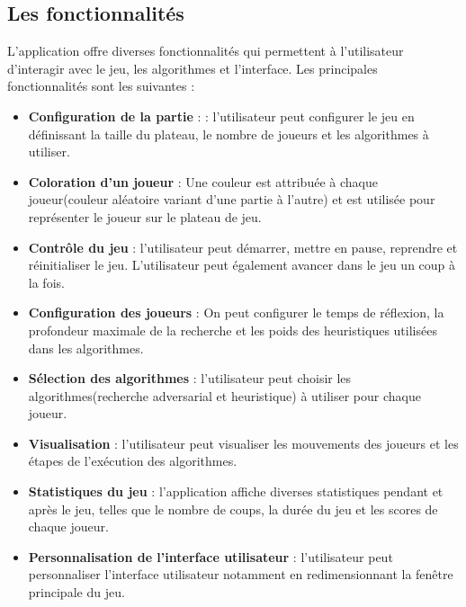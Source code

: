 \subsection{Les fonctionnalités}
L'application offre diverses fonctionnalités qui permettent à l'utilisateur d'interagir avec le jeu, les algorithmes et l'interface. 
Les principales fonctionnalités sont les suivantes :
\begin{itemize}
	\item \textbf{Configuration de la partie} : : l'utilisateur peut configurer le jeu en définissant la taille du plateau, le nombre de joueurs et les algorithmes à utiliser.
	\item \textbf{Coloration d'un joueur} : Une couleur est attribuée à chaque joueur(couleur aléatoire variant d'une partie à l'autre) et est utilisée pour représenter le joueur sur le plateau de jeu.
	\item \textbf{Contrôle du jeu} : l'utilisateur peut démarrer, mettre en pause, reprendre et réinitialiser le jeu. L'utilisateur peut également avancer dans le jeu un coup à la fois.
	\item \textbf{Configuration des joueurs} : On peut configurer le temps de réflexion, la profondeur maximale de la recherche et les poids des heuristiques utilisées dans les algorithmes.
	\item \textbf{Sélection des algorithmes} : l'utilisateur peut choisir les algorithmes(recherche adversarial et heuristique) à utiliser pour chaque joueur.
	\item \textbf{Visualisation} : l'utilisateur peut visualiser les mouvements des joueurs et les étapes de l'exécution des algorithmes.
	\item \textbf{Statistiques du jeu} : l'application affiche diverses statistiques pendant et après le jeu, telles que le nombre de coups, la durée du jeu et les scores de chaque joueur.
	\item \textbf{Personnalisation de l'interface utilisateur} : l'utilisateur peut personnaliser l'interface utilisateur notamment en redimensionnant la fenêtre principale du jeu.
\end{itemize}





